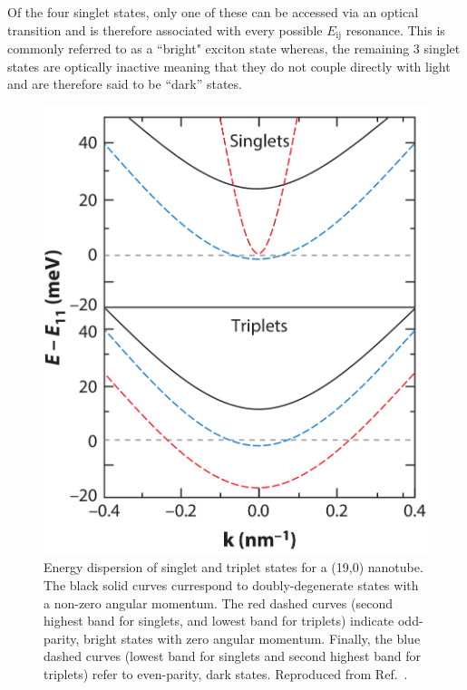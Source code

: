 Of the four singlet states, only one of these can be accessed via an optical transition and is therefore associated with every possible $E_\text{ij}$ resonance. This is commonly referred to as a ``bright" exciton state whereas, the remaining 3 singlet states are optically inactive meaning that they do not couple directly with light and are therefore said to be ``dark'' states.

\begin{figure}[ht]
	\centering
	\includegraphics[scale=0.25]{images/chapter_optical_props/dark_and_bright_excitons}
	\caption{Energy dispersion of singlet and triplet states for a (19,0) nanotube. The black solid curves currespond to doubly-degenerate states with a non-zero angular momentum. The red dashed curves (second highest band for singlets, and lowest band for triplets) indicate odd-parity, bright states with zero angular momentum. Finally, the blue dashed curves (lowest band for singlets and second highest band for triplets) refer to even-parity, dark states. Reproduced from Ref.\ \cite{amori2018excitons}.}
	\label{fig:dark_bright_excitons_dispersion}
\end{figure}

